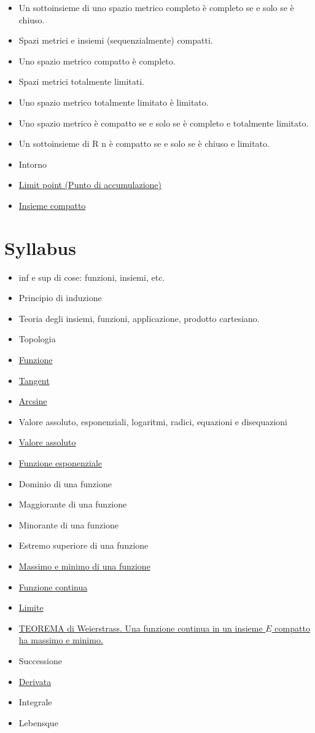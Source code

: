 \documentclass[a4paper,10pt]{article}
\begin{document}
\begin{itemize}
 \item Un sottoinsieme di uno spazio metrico completo è completo se e solo se è chiuso. 
 \item Spazi metrici e insiemi (sequenzialmente) compatti. 
 \item Uno spazio metrico compatto è completo. 
 \item Spazi metrici totalmente limitati. 
 \item Uno spazio metrico totalmente limitato è limitato. 
 \item Uno spazio metrico è compatto se e solo se è completo e totalmente limitato. 
 \item Un sottoinsieme di R n è compatto se e solo se è chiuso e limitato. 
 \item Intorno
 \item \href{LimitPoint.html}{Limit point (Punto di accumulazione)}
 \item \href{InsiemeCompatto.html}{Insieme compatto}
\end{itemize}


\section{Syllabus}
\begin{itemize}
 \item inf e sup di cose: funzioni, insiemi, etc.
 \item Principio di induzione
 \item Teoria degli insiemi, funzioni, applicazione, prodotto cartesiano.
 \item Topologia
 \item \href{Function.html}{Funzione}
 \item \href{Tangent.html}{Tangent}
 \item \href{Arcsine.html}{Arcsine}
 \item Valore assoluto, esponenziali, logaritmi, radici, equazioni e disequazioni
 \item \href{./ValoreAssoluto.html}{Valore assoluto}
 \item \href{./FunzioneEsponenziale.html}{Funzione esponenziale}
 \item Dominio di una funzione
 \item Maggiorante di una funzione
 \item Minorante di una funzione
 \item Estremo superiore di una funzione
 \item \href{FunzioneMassimoMinimo.html}{Massimo e minimo di una funzione}
 \item \href{FunzioneContinua.html}{Funzione continua}
 \item \href{Limite.html}{Limite}
 \item \href{Weierstrass.html}{TEOREMA di Weierstrass. Una funzione continua in un insieme $E$ compatto ha massimo e minimo.}
 \item Successione
 \item \href{Derivata.html}{Derivata} 
 \item Integrale
 \item Lebensque
\end{itemize}
\end{document}
